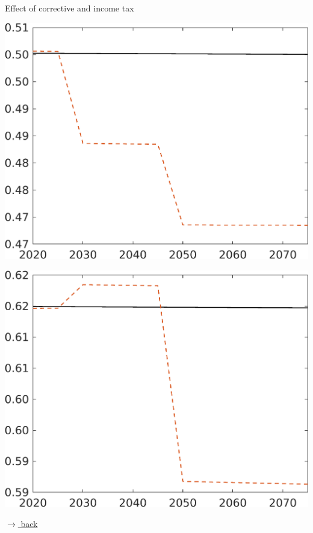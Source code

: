 \documentclass[11pt,aspectratio=169]{beamer}
\begin{document}
\begin{frame}{Effect of corrective and income tax}
\begin{minipage}[]{0.3\textwidth}
	\end{minipage}
	\begin{minipage}[]{0.3\textwidth}
		\includegraphics[width=1\textwidth]{../codding_model/own_basedOnFried/optimalPol_elastS_DisuSci/figures/all_1705/CompCounterFac_withLF_noopt_taufopt1_taulopt0_EY_spillover0_noskill0_sep1_BN0_ineq0_red0_xgrowth0_etaa0.79_lgd0.png}
	\end{minipage}
	\begin{minipage}[]{0.3\textwidth}
		\includegraphics[width=1\textwidth]{../codding_model/own_basedOnFried/optimalPol_elastS_DisuSci/figures/all_1705/CompCounterFac_withLF_noopt_taufopt1_taulopt0_CY_spillover0_noskill0_sep1_BN0_ineq0_red0_xgrowth0_etaa0.79_lgd0.png}
	\end{minipage}
	
	\vspace{-1mm}
	\hfill
	\hyperlink{effalloback}{\tiny{$\rightarrow$ back}} 
\end{frame}
\end{document}
